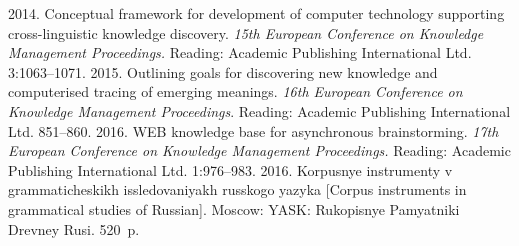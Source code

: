 







 \begin{multicols}{2}

\renewcommand{\bibname}{\protect\rmfamily References}

{\small\frenchspacing
 {\baselineskip=10.75pt
 \begin{thebibliography}{99}

 2014. Conceptual framework for 
development of computer technology supporting cross-linguistic knowledge discovery. \textit{15th European 
Conference on Knowledge Management Proceedings.} Reading:
Academic Publishing International Ltd. 3:1063--1071.
 2015. Outlining goals for discovering new knowledge and computerised 
tracing of emerging meanings. \textit{16th European Conference on Knowledge Management Proceedings}. 
Reading: Academic Publishing International Ltd. 851--860.
 2016. WEB knowledge base for 
asynchronous brainstorming. \textit{17th European Conference on Knowledge Management Proceedings.}  
Reading: Academic Publishing International Ltd. 1:976--983.
 2016. Korpusnye instrumenty v grammaticheskikh issledovaniyakh russkogo 
yazyka [Corpus instruments in grammatical studies of Russian]. Moscow: YASK: Rukopisnye Pamyatniki 
Drevney Rusi. 520~p.


\end{thebibliography}}}
\end{multicols}
